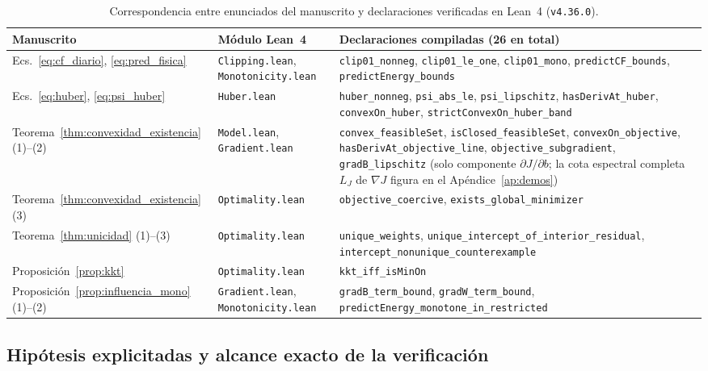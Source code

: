 \begin{table}[!htbp]
\centering
\caption{Correspondencia entre enunciados del manuscrito y declaraciones verificadas en Lean~4 (\texttt{v4.36.0}).}
\label{tab:lean4-correspondencia}
\small
\begin{tabularx}{\textwidth}{@{}p{2.6cm}p{2.7cm}L@{}}
\toprule
\textbf{Manuscrito} & \textbf{Módulo Lean~4} & \textbf{Declaraciones compiladas (26 en total)} \\
\midrule
Ecs.~\eqref{eq:cf_diario}, \eqref{eq:pred_fisica} & \texttt{Clipping.lean}, \texttt{Monotonicity.lean} & \texttt{clip01\_nonneg}, \texttt{clip01\_le\_one}, \texttt{clip01\_mono}, \texttt{predictCF\_bounds}, \texttt{predictEnergy\_bounds} \\
Ecs.~\eqref{eq:huber}, \eqref{eq:psi_huber} & \texttt{Huber.lean} & \texttt{huber\_nonneg}, \texttt{psi\_abs\_le}, \texttt{psi\_lipschitz}, \texttt{hasDerivAt\_huber}, \texttt{convexOn\_huber}, \texttt{strictConvexOn\_huber\_band} \\
Teorema~\ref{thm:convexidad_existencia} (1)--(2) & \texttt{Model.lean}, \texttt{Gradient.lean} & \texttt{convex\_feasibleSet}, \texttt{isClosed\_feasibleSet}, \texttt{convexOn\_objective}, \texttt{hasDerivAt\_objective\_line}, \texttt{objective\_subgradient}, \texttt{gradB\_lipschitz} (solo componente $\partial J/\partial b$; la cota espectral completa $L_J$ de $\nabla J$ figura en el Apéndice~\ref{ap:demos}) \\
Teorema~\ref{thm:convexidad_existencia} (3) & \texttt{Optimality.lean} & \texttt{objective\_coercive}, \texttt{exists\_global\_minimizer} \\
Teorema~\ref{thm:unicidad} (1)--(3) & \texttt{Optimality.lean} & \texttt{unique\_weights}, \texttt{unique\_intercept\_of\_interior\_residual}, \texttt{intercept\_nonunique\_counterexample} \\
Proposición~\ref{prop:kkt} & \texttt{Optimality.lean} & \texttt{kkt\_iff\_isMinOn} \\
Proposición~\ref{prop:influencia_mono} (1)--(2) & \texttt{Gradient.lean}, \texttt{Monotonicity.lean} & \texttt{gradB\_term\_bound}, \texttt{gradW\_term\_bound}, \texttt{predictEnergy\_monotone\_in\_restricted} \\
\bottomrule
\end{tabularx}
\end{table}

\subsection{Hipótesis explicitadas y alcance exacto de la verificación}

